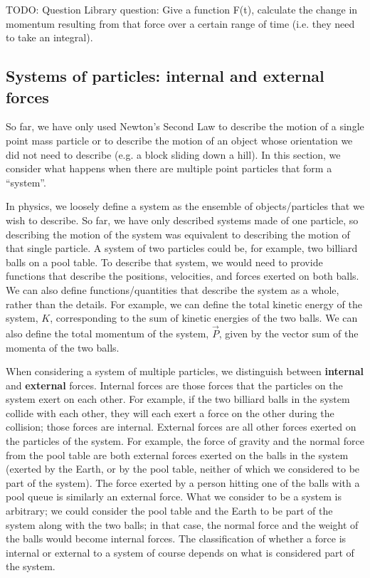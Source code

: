 TODO: Question Library question: Give a function F(t), calculate the change in momentum resulting from that force over a certain range of time (i.e. they need to take an integral). 

\subsection{Systems of particles: internal and external forces}
So far, we have only used Newton's Second Law to describe the motion of a single point mass particle or to describe the motion of an object whose orientation we did not need to describe (e.g. a block sliding down a hill). In this section, we consider what happens when there are multiple point particles that form a ``system''.

In physics, we loosely define a system as the ensemble of objects/particles that we wish to describe. So far, we have only described systems made of one particle, so describing the motion of the system was equivalent to describing the motion of that single particle. A  system of two particles could be, for example, two billiard balls on a pool table. To describe that system, we would need to provide functions that describe the positions, velocities, and forces exerted on both balls. We can also define functions/quantities that describe the system as a whole, rather than the details. For example, we can define the total kinetic energy of the system, $K$, corresponding to the sum of kinetic energies of the two balls. We can also define the total momentum of the system, $\vec P$, given by the vector sum of the momenta of the two balls.

When considering a system of multiple particles, we distinguish between \textbf{internal} and \textbf{external} forces. Internal forces are those forces that the particles on the system exert on each other. For example, if the two billiard balls in the system collide with each other, they will each exert a force on the other during the collision; those forces are internal. External forces are all other forces exerted on the particles of the system. For example, the force of gravity and the normal force from the pool table are both external forces exerted on the balls in the system (exerted by the Earth, or by the pool table, neither of which we considered to be part of the system). The force exerted by a person hitting one of the balls with a pool queue is similarly an external force. What we consider to be a system is arbitrary; we could consider the pool table and the Earth to be part of the system along with the two balls; in that case, the normal force and the weight of the balls would become internal forces. The classification of whether a force is internal or external to a system of course depends on what is considered part of the system.

